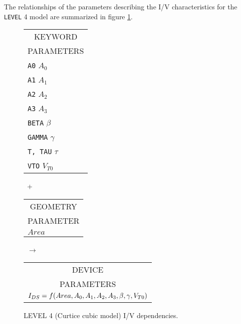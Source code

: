 The relationships of the parameters describing the I/V
characteristics for the {\tt LEVEL} 4 model are summarized in figure
\ref{blevel4i/v}.\\[0.1in]
\begin{figure}[h]
\begin{tabular}[t]{|p{1in}|}
\hline
\multicolumn{1}{|c|}{KEYWORD} \\
\multicolumn{1}{|c|}{PARAMETERS} \\
\hline
\hline
{\tt A0} \hfill $A_0$\\
{\tt A1} \hfill $A_1$\\
{\tt A2} \hfill $A_2$\\
{\tt A3} \hfill $A_3$\\
{\tt BETA} \hfill $\beta$\\
{\tt GAMMA} \hfill $\gamma$\\
{\tt T, TAU} \hfill $\tau$\\
{\tt VTO} \hfill $V_{T0}$\\
\hline
\end{tabular}
\hfill
\parbox{0.2in}{\ \vspace*{0.2in}\newline +}
\hfill
\begin{tabular}[t]{|p{1in}|}
\hline
\multicolumn{1}{|c|}{GEOMETRY} \\
\multicolumn{1}{|c|}{PARAMETER} \\
\hline
\hspace*{\fill}$Area$\\
\hline
\end{tabular}
\hfill
\parbox{0.2in}{\ \vspace*{0.2in}\newline $\rightarrow$}
\hfill
\begin{tabular}[t]{|p{1.8in}|}
\hline
\multicolumn{1}{|c|}{DEVICE} \\
\multicolumn{1}{|c|}{PARAMETERS} \\
$I_{DS}=f(Area,\newline\hspace*{\fill}A_0,A_1,A_2,A_3,\beta,\gamma,V_{T0})$\\
\hline
\end{tabular}
\caption{LEVEL 4 (Curtice cubic model) I/V dependencies. \label{blevel4i/v}}
\end{figure}

